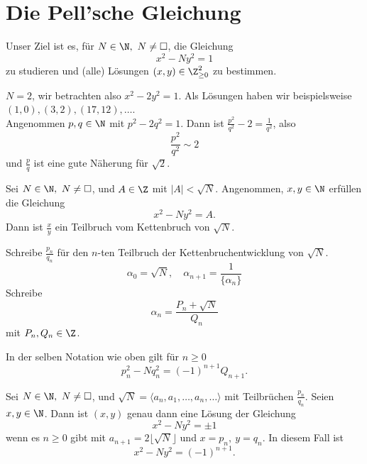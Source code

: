 \chapter{Die Pell'sche Gleichung}

Unser Ziel ist es, für $N \in \N,\ N \neq \square$, die Gleichung
\[ x^2-Ny^2=1 \]
zu studieren und (alle) Lösungen $(x,y)\in \Z_{\geq0}^2$ zu bestimmen.

\begin{exmp*}
	$N=2$, wir betrachten also $x^2-2y^2=1$. Als Lösungen haben wir beispielsweise $(1,0),(3,2),(17,12),\dotsc$.\\
	Angenommen $p,q \in \N$ mit $p^2-2q^2=1$. Dann ist $\frac{p^2}{q^2} - 2 = \frac{1}{q^2}$, also 
	\[ \frac{p^2}{q^2} \sim 2 \]
	und $\frac{p}{q}$ ist eine gute Näherung für $\sqrt{2}$.
\end{exmp*}

\begin{thm}\autolabel
	Sei $N \in \N,\ N \neq \square$, und $A \in \Z$ mit $|A| < \sqrt{N}$. Angenommen, $x,y \in \N$ erfüllen die Gleichung 
	\[ x^2-Ny^2=A. \]
	Dann ist $\frac{x}{y}$ ein Teilbruch vom Kettenbruch von $\sqrt{N}$.
\end{thm}

\begin{notat*}
	Schreibe $\frac{p_n}{q_n}$ für den $n$-ten Teilbruch der Kettenbruchentwicklung von $\sqrt{N}$.
	\[ \alpha_0 = \sqrt{N},\quad \alpha_{n+1} = \frac{1}{\{\alpha_n\}} \]
	Schreibe
	\[ \alpha_n = \frac{P_n + \sqrt{N}}{Q_n} \]
	mit $P_n,Q_n \in \Z$.
\end{notat*}

\begin{thm}\autolabel
	In der selben Notation wie oben gilt für $n \geq 0$
	\[ p_n^2-Nq_n^2 = (-1)^{n+1} Q_{n+1}. \]
\end{thm}

\begin{thm}\autolabel
	Sei $N \in \N,\ N \neq \square$, und $\sqrt{N} = \langle a_n,a_1,\dotsc,a_n,\dotsc\rangle$ mit Teilbrüchen $\frac{p_n}{q_n}$. Seien $x,y \in \N$. Dann ist $(x,y)$ genau dann eine Lösung der Gleichung
	\[ x^2-Ny^2=\pm 1 \]
	wenn es $n \geq 0$ gibt mit $a_{n+1} = 2 \lfloor \sqrt{N} \rfloor$ und $x=p_n,\ y=q_n$. In diesem Fall ist
	\[ x^2-Ny^2 = (-1)^{n+1}. \]
\end{thm}